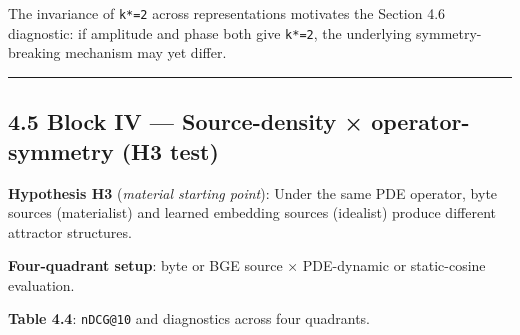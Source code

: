 \documentclass[
]{article}
\begin{document}
The invariance of \texttt{k*=2} across representations motivates the
Section 4.6 diagnostic: if amplitude and phase both give \texttt{k*=2},
the underlying symmetry-breaking mechanism may yet differ.

\begin{center}\rule{0.5\linewidth}{0.5pt}\end{center}

\hypertarget{block-iv-source-density-operator-symmetry-h3-test}{%
\subsection{4.5 Block IV --- Source-density × operator-symmetry (H3
test)}\label{block-iv-source-density-operator-symmetry-h3-test}}

\textbf{Hypothesis H3} (\emph{material starting point}): Under the same
PDE operator, byte sources (materialist) and learned embedding sources
(idealist) produce different attractor structures.

\textbf{Four-quadrant setup}: byte or BGE source × PDE-dynamic or
static-cosine evaluation.

\textbf{Table 4.4}: \texttt{nDCG@10} and diagnostics across four
quadrants.
\end{document}
